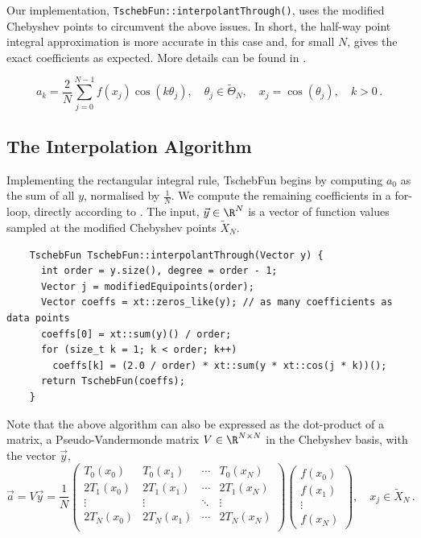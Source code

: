 \documentclass[12pt, a4paper]{article}
\newcommand{\chebyshev}{Chebyshev\xspace}
\newcommand{\tschebfun}{\textcolor{themecolor3}{TschebFun}\xspace}
\begin{document}
  Our implementation, \texttt{\tschebfun::\textcolor{themecolor2}{interpolantThrough}()}, uses the modified Chebyshev points to circumvent the above issues.
  In short, the half-way point integral approximation is more accurate in this case and, for small $N$, gives the exact coefficients as expected.
  More details can be found in \cite{CombTrig}.

  \begin{equation}
    a_k = \frac{2}{N} \sum_{j=0}^{N-1} f(x_j) \cos(k \theta_j), \quad \theta_j \in \tilde{\Theta}_N, \quad x_j = \cos(\theta_j), \quad k > 0 \,.
    \label{eq:coefficient-formula}
  \end{equation}

  \subsection{The Interpolation Algorithm}
  Implementing the rectangular integral rule, \tschebfun begins by computing $a_0$ as the sum of all $y$, normalised by $\frac{1}{N}$.
  We compute the remaining coefficients in a for-loop, directly according to .
  The input, $\vec{y} \in \R^N$ is a vector of function values sampled at the modified \chebyshev points $\tilde{X}_N$.
  \begin{verbatim}
    TschebFun TschebFun::interpolantThrough(Vector y) {
      int order = y.size(), degree = order - 1;
      Vector j = modifiedEquipoints(order);
      Vector coeffs = xt::zeros_like(y); // as many coefficients as data points
      coeffs[0] = xt::sum(y)() / order;
      for (size_t k = 1; k < order; k++)
        coeffs[k] = (2.0 / order) * xt::sum(y * xt::cos(j * k))();
      return TschebFun(coeffs);
    }
  \end{verbatim}

  Note that the above algorithm can also be expressed as the dot-product of a matrix, a Pseudo-Vandermonde matrix $V \in \R^{N\times N}$ in the \chebyshev basis, with the vector $\vec{y}$,
  $$\vec{a} = V \vec{y} = \frac{1}{N} \begin{pmatrix}
      T_0(x_0)  & T_0(x_1)  & \cdots & T_0(x_N)  \\
      2T_1(x_0) & 2T_1(x_1) & \cdots & 2T_1(x_N) \\
      \vdots    & \vdots    & \ddots & \vdots    \\
      2T_N(x_0) & 2T_N(x_1) & \cdots & 2T_N(x_N) \\
    \end{pmatrix} \begin{pmatrix}
      f(x_0) \\
      f(x_1) \\
      \vdots \\
      f(x_N)
    \end{pmatrix}, \quad x_j \in \tilde{X}_N \,.$$
\end{document}
